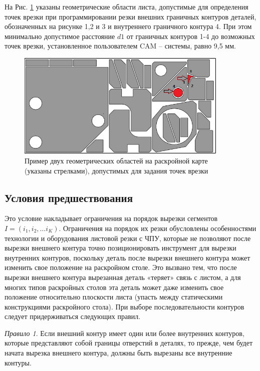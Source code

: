 \documentclass[12pt,twoside]{report}
\begin{document}
На Рис. \ref{pierce-area} указаны геометрические области листа,
допустимые для определения точек врезки при программировании резки
внешних граничных контуров деталей,
обозначенных на рисунке 1,2 и 3 и внутреннего граничного контура 4.
При этом минимально допустимое расстояние $d1$ от граничных контуров 1-4 до возможных точек врезки,
установленное пользователем CAM – системы, равно 9,5 мм.

\begin{figure}
  \begin{center}
  \includegraphics[width=0.9\textwidth]{pierce-area.png}
  \caption{Пример двух геометрических областей на раскройной карте (указаны стрелками),
допустимых для задания точек врезки }
  \label{pierce-area}
  \end{center}
\end{figure}

\subsection{Условия предшествования}

Это условие накладывает ограничения на порядок вырезки сегментов
$ I = (i_1, i_2, \dots i_K)$.
Ограничения на порядок их резки обусловлены особенностями
технологии и оборудования листовой резки с ЧПУ,
которые не позволяют после вырезки внешнего контура точно
позиционировать инструмент для вырезки внутренних контуров,
поскольку деталь после вырезки внешнего контура может
изменить свое положение на раскройном столе.
Это вызвано тем, что после вырезки внешнего контура
вырезанная деталь «теряет» связь с листом,
а для многих типов раскройных столов эта деталь
может даже изменить свое положение относительно плоскости листа
(упасть между статическими конструкциями раскройного стола).
При выборе последовательности контуров следует придерживаться следующих правил.

{\it Правило 1}.
Если внешний контур имеет один или более внутренних контуров,
которые представляют собой границы отверстий в деталях,
то прежде, чем будет начата вырезка внешнего контура,
должны быть вырезаны все внутренние контуры.
\end{document}
